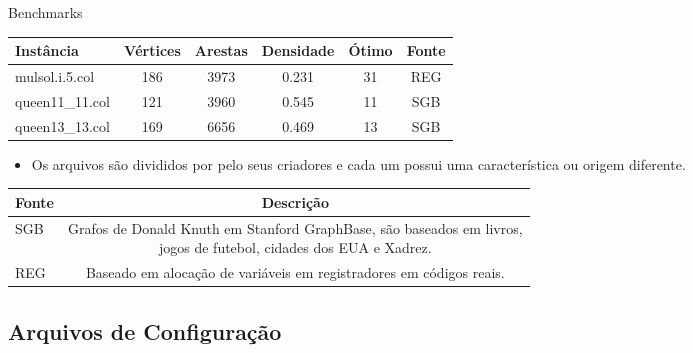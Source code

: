 			
			\begin{frame}{Benchmarks}
				
				\footnotesize
				{	
					\begin{table}
						\centering
						\begin{tabular}{l|c|c|c|c|c}
							
							\textbf{Instância}       & \textbf{Vértices} & \textbf{Arestas} & \textbf{Densidade} & \textbf{Ótimo} & \textbf{Fonte}\\ \hline \hline
							mulsol.i.5.col  & 186      & 3973    & 0.231     & 31     &  REG  \\
							queen11\_11.col & 121      & 3960    & 0.545     & 11     &  SGB  \\
							queen13\_13.col & 169      & 6656    & 0.469     & 13     &  SGB  \\
						\end{tabular}
					\end{table}
				}	
                
				\bigskip
				
				\begin{itemize}
					
					\item Os arquivos são divididos por pelo seus criadores e cada um possui uma característica ou origem diferente.
					
					
				\end{itemize}
				
					\scriptsize
					{	
						\begin{table}
							\begin{tabular}{l|c}
								\textbf{Fonte} & \textbf{Descrição}                                                                                                           \\ \hline \hline
								SGB   & \specialcell{Grafos de Donald Knuth em Stanford GraphBase, são baseados em livros,\\ jogos de futebol, cidades dos EUA e Xadrez.} \\\hline
								REG   & Baseado em alocação de variáveis em registradores em códigos reais. \\
							\end{tabular}
						\end{table}
					}
					
			\end{frame}
		
        
        \subsection{Arquivos de Configuração}
        
